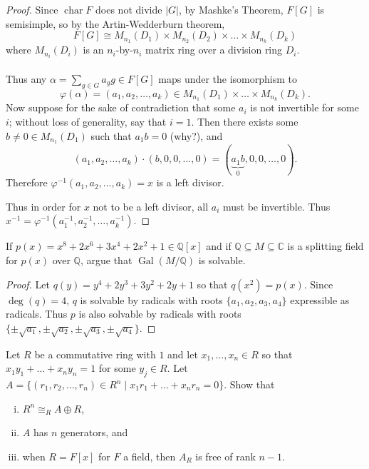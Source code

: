 \documentclass{article}
\newenvironment{problem}[2][Problem]{\begin{trivlist}
\item[\hskip \labelsep {\bfseries #1}\hskip \labelsep {\bfseries #2.}]}{\end{trivlist}}
\newcommand{\Q}{\mathbb Q}
\newcommand{\C}{\mathbb C}
\newcommand{\set}[1]{\{#1\}}
\newcommand{\chr}{\operatorname{char}}
\newcommand{\Gal}{\operatorname{Gal}}
\begin{document}
\begin{proof}
  Since $\chr F$ does not divide $|G|$, by Mashke's Theorem, $F[G]$ is semisimple, so by the Artin-Wedderburn theorem, \[
    F[G] \cong M_{n_1}(D_1) \times M_{n_2}(D_2) \times \hdots \times M_{n_k}(D_k)
  \] where $M_{n_i}(D_i)$ is an $n_i$-by-$n_i$ matrix ring over a division ring
  $D_i$.
  \\~\\
  Thus any $\alpha = \sum_{g \in G} a_gg \in F[G]$ maps under the isomorphism to \[
    \varphi(\alpha) = (a_1, a_2, \hdots, a_k) \in M_{n_1}(D_1) \times \hdots \times M_{n_k}(D_k).
  \]
  Now suppose for the sake of contradiction that some $a_i$ is not invertible for
  some $i$; without loss of generality, say that $i=1$.
  Then there exists some $b \neq 0 \in M_{n_1}(D_1)$ such that $a_1b = 0$ (why?),
  and \[
    (a_1, a_2, \hdots, a_k)\cdot(b, 0, 0, \hdots, 0) = (\underbrace{a_1b}_0, 0, 0, \hdots, 0).
  \] Therefore $\varphi^{-1}(a_1, a_2, \hdots, a_k) = x$ is a left divisor.

  Thus in order for $x$ not to be a left divisor, all $a_i$ must be invertible.
  Thus $x^{-1} = \varphi^{-1}(a_1^{-1}, a_2^{-1}, \hdots, a_k^{-1})$.
\end{proof}
\pagebreak

\begin{problem}{4}
  If $p(x) = x^8 + 2x^6 + 3x^4 + 2x^2 + 1 \in \Q[x]$ and if
  $\Q \subseteq M \subseteq \C$ is a splitting field for $p(x)$ over $\Q$,
  argue that $\Gal(M/\Q)$ is solvable.
\end{problem}

\begin{proof}
  Let $q(y) = y^4 + 2y^3 + 3y^2 + 2y + 1$ so that $q(x^2) = p(x)$. Since
  $\deg(q) = 4$, $q$ is solvable by radicals with roots
  $\set{a_1, a_2, a_3, a_4}$ expressible as radicals. Thus $p$ is also solvable
  by radicals with roots
  $\set{\pm\sqrt{a_1}, \pm\sqrt{a_2}, \pm\sqrt{a_3}, \pm\sqrt{a_4}}$.
\end{proof}
\pagebreak

\begin{problem}{5}
  Let $R$ be a commutative ring with $1$ and let $x_1, \hdots, x_n \in R$
  so that $x_1y_1 + \hdots + x_ny_n = 1$ for some $y_j \in R$. Let
  $A = \set{(r_1, r_2, \hdots, r_n) \in R^n \mid x_1r_1 + \hdots + x_nr_n = 0}.$
  Show that \begin{enumerate}[(i)]
    \item $R^n \cong_R A \oplus R$,
    \item $A$ has $n$ generators, and
    \item when $R = F[x]$ for $F$ a field, then $A_R$ is free of rank $n-1$.
  \end{enumerate}
\end{problem}
\end{document}

